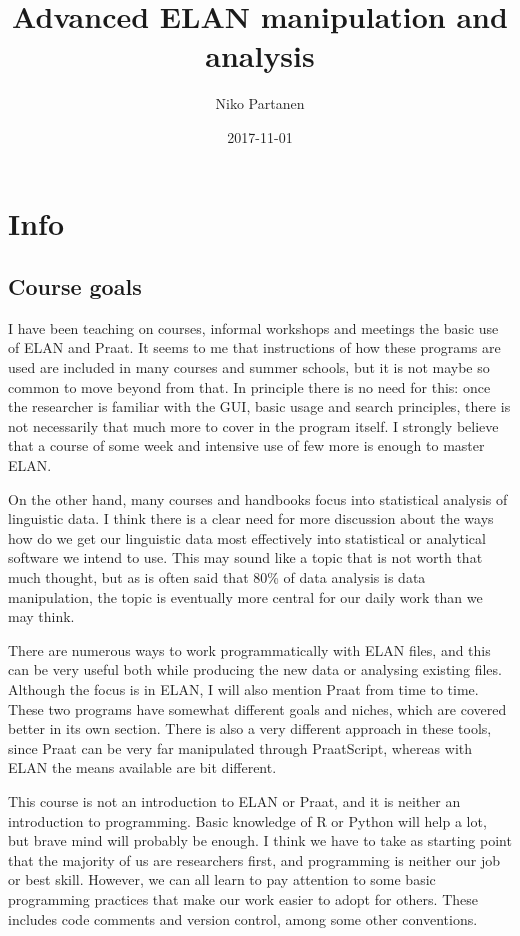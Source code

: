 \documentclass[]{book}
\title{Advanced ELAN manipulation and analysis}
\author{Niko Partanen}
\date{2017-11-01}
\theoremstyle{definition}
\theoremstyle{definition}
\theoremstyle{definition}
\theoremstyle{remark}
\begin{document}
\maketitle

{
\setcounter{tocdepth}{1}
\tableofcontents
}
\chapter{Info}\label{info}

\section{Course goals}\label{course-goals}

I have been teaching on courses, informal workshops and meetings the
basic use of ELAN and Praat. It seems to me that instructions of how
these programs are used are included in many courses and summer schools,
but it is not maybe so common to move beyond from that. In principle
there is no need for this: once the researcher is familiar with the GUI,
basic usage and search principles, there is not necessarily that much
more to cover in the program itself. I strongly believe that a course of
some week and intensive use of few more is enough to master ELAN.

On the other hand, many courses and handbooks focus into statistical
analysis of linguistic data. I think there is a clear need for more
discussion about the ways how do we get our linguistic data most
effectively into statistical or analytical software we intend to use.
This may sound like a topic that is not worth that much thought, but as
is often said that 80\% of data analysis is data manipulation, the topic
is eventually more central for our daily work than we may think.

There are numerous ways to work programmatically with ELAN files, and
this can be very useful both while producing the new data or analysing
existing files. Although the focus is in ELAN, I will also mention Praat
from time to time. These two programs have somewhat different goals and
niches, which are covered better in its own section. There is also a
very different approach in these tools, since Praat can be very far
manipulated through PraatScript, whereas with ELAN the means available
are bit different.

This course is not an introduction to ELAN or Praat, and it is neither
an introduction to programming. Basic knowledge of R or Python will help
a lot, but brave mind will probably be enough. I think we have to take
as starting point that the majority of us are researchers first, and
programming is neither our job or best skill. However, we can all learn
to pay attention to some basic programming practices that make our work
easier to adopt for others. These includes code comments and version
control, among some other conventions.
\end{document}
